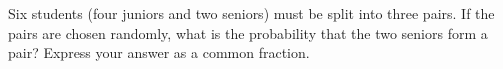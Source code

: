Six students (four juniors and two seniors) must be split into three pairs. If the pairs are chosen randomly, what is the probability that the two seniors form a pair? Express your answer as a common fraction.
